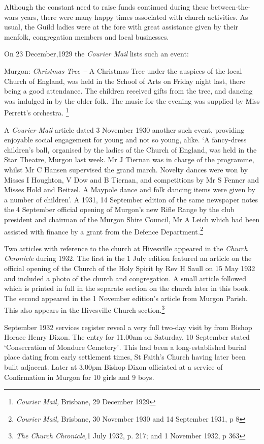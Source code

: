 Although the constant need to raise funds continued during these
between-the-wars years, there were many happy times associated with
church activities. As usual, the Guild ladies were at the fore with
great assistance given by their menfolk, congregation members and local
businesses.

On 23 December,1929 the \emph{Courier Mail} lists such an event:

Murgon: \emph{Christmas Tree \textbf{-- }}A Christmas Tree under the
auspices of the local Church of England, was held in the School of Arts
on Friday night last, there being a good attendance. The children
received gifts from the tree, and dancing was indulged in by the older
folk. The music for the evening was supplied by Miss Perrett's
orchestra. \footnote{\emph{Courier Mail,} Brisbane, 29 December 1929}

A \emph{Courier Mail} article dated 3 November 1930 another such event,
providing enjoyable social engagement for young and not so young, alike.
`A fancy-dress children's ball\emph{\textbf{,}} organised by the ladies
of the Church of England, was held in the Star Theatre, Murgon last
week. Mr J Tiernan was in charge of the programme, whilst Mr C Hansen
supervised the grand march. Novelty dances were won by Misses I
Houghton, V Dow and B Tiernan, and competitions by Mr S Fenner and
Misses Hold and Beitzel. A Maypole dance and folk dancing items were
given by a number of children'. A 1931, 14 September edition of the same
newspaper notes the 4 September official opening of Murgon's new Rifle
Range by the club president and chairman of the Murgon Shire Council, Mr
A Leich which had been assisted with finance by a grant from the Defence
Department\emph{.}\footnote{\emph{Courier Mail,} Brisbane, 30 November
  1930 and 14 September 1931, p 8}

Two articles with reference to the church at Hivesville appeared in the
\emph{Church Chronicle} during 1932. The first in the 1 July edition
featured an article on the official opening of the Church of the Holy
Spirit by Rev H Saull on 15 May 1932 and included a photo of the church
and congregation. A small article followed which is printed in full in
the separate section on the church later in this book. The second
appeared in the 1 November edition's article from Murgon Parish. This
also appears in the Hivesville Church section.\footnote{\emph{The Church
  Chronicle,}1 July 1932, p. 217; and 1 November 1932, p 363}

September 1932 services register reveal a very full two-day visit by
from Bishop Horace Henry Dixon. The entry for 11.00am on Saturday, 10
September stated `Consecration of Mondure Cemetery'\emph{.} This had
been a long-established burial place dating from early settlement times,
St Faith's Church having later been built adjacent. Later at 3.00pm
Bishop Dixon officiated at a service of Confirmation in Murgon for 10
girls and 9 boys.

